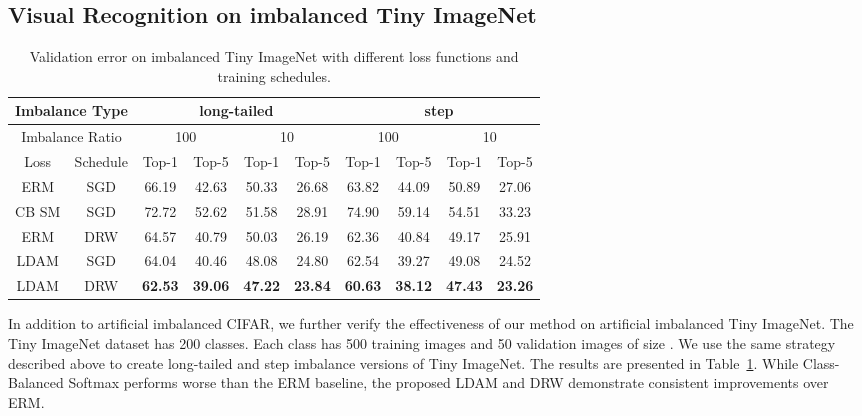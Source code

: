 \documentclass{article}
\newcommand{\ldam}{\textup{LDAM}}
\newcommand{\BMCE}{{\ldam}}
\newcommand{\tstagew}{DRW}
\newcommand{\ERM}{ERM}
\begin{document}
\subsection{Visual Recognition on imbalanced Tiny ImageNet}
\label{sec:tinyimagenet}

\begin{table}[]
	\caption{Validation error on imbalanced Tiny ImageNet with different loss functions and training schedules.}
	\label{tab:tiny-imagenet-table}
	\centering
	\begin{tabular}{cc|cc|cc|cc|cc}
		\toprule
		\multicolumn{2}{c|}{Imbalance Type}  & \multicolumn{4}{c|}{long-tailed}                     & \multicolumn{4}{c}{step}                  \\ \midrule
		\multicolumn{2}{c|}{Imbalance Ratio} & \multicolumn{2}{c|}{100} & \multicolumn{2}{c|}{10} & \multicolumn{2}{c|}{100} & \multicolumn{2}{c}{10} \\ \midrule
		Loss & Schedule          & Top-1       & Top-5       & Top-1       & Top-5      & Top-1       & Top-5       & Top-1       & Top-5      \\ \midrule
		ERM & SGD & 66.19 & 42.63 & 50.33 & 26.68 & 63.82 & 44.09 & 50.89 &   27.06 \\
		CB SM & SGD & 72.72 & 52.62 & 51.58 & 28.91 & 74.90 & 59.14 & 54.51 &    33.23    \\
		ERM & \tstagew{} & 64.57 & 40.79 & 50.03 & 26.19 & 62.36 & 40.84    & 49.17  & 25.91 \\    
		\BMCE{} & SGD & 64.04 & 40.46  & 48.08 & 24.80 & 62.54 & 39.27 & 49.08 & 24.52 \\
		\BMCE{} & \tstagew{} & \textbf{62.53} & \textbf{39.06} & \textbf{47.22} & 
		\textbf{23.84} & \textbf{60.63} & \textbf{38.12} & \textbf{47.43} & \textbf{23.26} \\ \bottomrule
	\end{tabular}
\end{table}

In addition to artificial imbalanced CIFAR, we further verify the effectiveness of our method on artificial imbalanced Tiny ImageNet. The Tiny ImageNet dataset has 200 classes. Each class has 500 training images and 50 validation images of size . We use the same strategy described above to create long-tailed and step imbalance versions of Tiny ImageNet. The results are presented in Table~\ref{tab:tiny-imagenet-table}. While Class-Balanced Softmax performs worse than the \ERM{} baseline, the proposed \BMCE{} and \tstagew{} demonstrate consistent improvements over \ERM{}.
\end{document}
